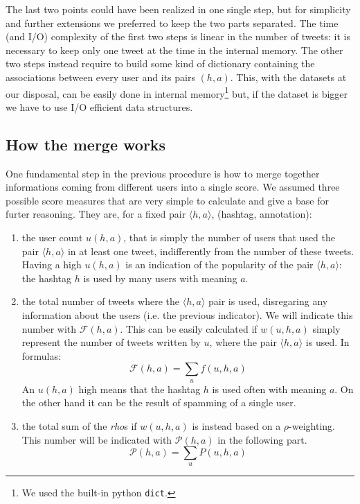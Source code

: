 \documentclass[a4paper,11pt,oneside]{article}
\begin{document}
The last two points could have been realized in one single step, but for simplicity and further extensions we preferred to keep the two parts separated. The time (and I/O) complexity of the first two steps is linear in the number of tweets: it is necessary to keep only one tweet at the time in the internal memory. 
The other two steps instead require to build some kind of dictionary containing the associations between every user and its pairs $(h,a)$. This, with the datasets at our disposal, can be easily done in internal memory\footnote{We used the built-in python \texttt{dict}.} but, if the dataset is bigger we have to use I/O efficient data structures.


\subsection{How the merge works}
\label{sec:merge}
One fundamental step in the previous procedure is how to merge together informations coming from different users into a single score. We assumed three possible score measures that are very simple to calculate and give a base for furter reasoning. They are, for a fixed pair $\langle h,a \rangle$, (hashtag, annotation):
\begin{enumerate}
\item the user count $u(h,a)$, that is simply the number of users that used the pair $\langle h,a \rangle$ in at least one tweet, indifferently from the number of these tweets. Having a high $u(h,a)$ is an indication of the popularity of the pair $\langle h,a \rangle$: the hashtag $h$ is used by many users with meaning $a$.

\item the total number of tweets where the $\langle h,a \rangle$ pair is used, disregaring any information about the users (i.e. the previous indicator). We will indicate this number with $\mathcal{F}(h,a)$. This can be easily calculated if $w(u,h,a)$ simply represent the number of tweets written by $u$, where the pair $\langle h,a \rangle$ is used. In formulas:
\begin{equation}
\label{eqn:frequency}
\mathcal{F}(h,a) = \sum_{u} f(u,h,a)
\end{equation}
An $u(h,a)$ high means that the hashtag $h$ is used often with meaning $a$. On the other hand it can be the result of spamming of a single user.

\item the total sum of the \textit{rho}s if $w(u,h,a)$ is instead based on a $\rho$-weighting. This number will be indicated with $\mathcal{P}(h,a)$ in the following part.
\begin{equation}
\mathcal{P}(h,a) = \sum_{u} P(u,h,a)
\end{equation}
\end{enumerate}
\end{document}
